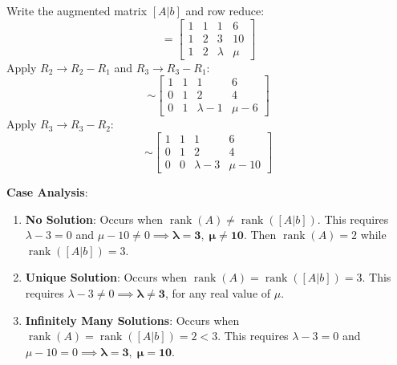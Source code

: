 \begin{solutionbox}
Write the augmented matrix $[A|b]$ and row reduce:
\begin{equation}
[A|b] = \begin{bmatrix}
1 & 1 & 1 & 6 \\
1 & 2 & 3 & 10 \\
1 & 2 & \lambda & \mu
\end{bmatrix}
\end{equation}
Apply $R_2 \to R_2 - R_1$ and $R_3 \to R_3 - R_1$:
\begin{equation}
\sim \begin{bmatrix}
1 & 1 & 1 & 6 \\
0 & 1 & 2 & 4 \\
0 & 1 & \lambda - 1 & \mu - 6
\end{bmatrix}
\end{equation}
Apply $R_3 \to R_3 - R_2$:
\begin{equation}
\sim \begin{bmatrix}
1 & 1 & 1 & 6 \\
0 & 1 & 2 & 4 \\
0 & 0 & \lambda - 3 & \mu - 10
\end{bmatrix}
\end{equation}

\textbf{Case Analysis}:
\begin{enumerate}[leftmargin=1.5em]
    \item \textbf{No Solution}: Occurs when $\operatorname{rank}(A) \ne \operatorname{rank}([A|b])$.
    This requires $\lambda - 3 = 0$ and $\mu - 10 \ne 0 \implies \mathbf{\lambda = 3, \; \mu \ne 10}$. Then $\operatorname{rank}(A) = 2$ while $\operatorname{rank}([A|b]) = 3$.
    \item \textbf{Unique Solution}: Occurs when $\operatorname{rank}(A) = \operatorname{rank}([A|b]) = 3$.
    This requires $\lambda - 3 \ne 0 \implies \mathbf{\lambda \ne 3}$, for any real value of $\mu$.
    \item \textbf{Infinitely Many Solutions}: Occurs when $\operatorname{rank}(A) = \operatorname{rank}([A|b]) = 2 < 3$.
    This requires $\lambda - 3 = 0$ and $\mu - 10 = 0 \implies \mathbf{\lambda = 3, \; \mu = 10}$.
\end{enumerate}
\end{solutionbox}

